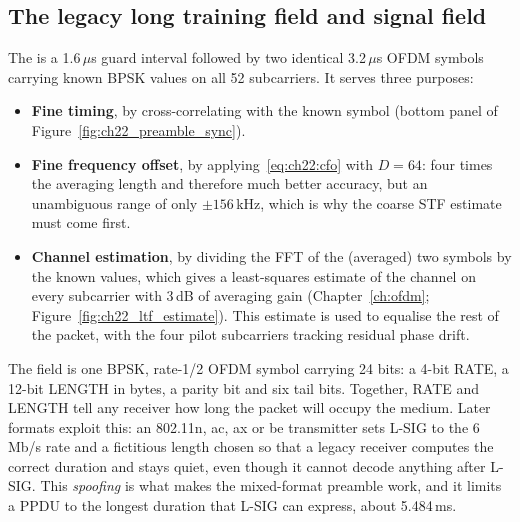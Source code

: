 \subsection{The legacy long training field and signal field}


The  is a 1.6\,$\mu$s guard interval followed by two identical 3.2\,$\mu$s OFDM symbols
carrying known BPSK values on all 52 subcarriers. It serves three purposes:
\begin{itemize}
\item \textbf{Fine timing}, by cross-correlating with the known symbol (bottom panel of
Figure~\ref{fig:ch22_preamble_sync}).
\item \textbf{Fine frequency offset}, by applying~\eqref{eq:ch22:cfo} with $D=64$: four times the
averaging length and therefore much better accuracy, but an unambiguous range of only
$\pm156$\,kHz, which is why the coarse STF estimate must come first.
\item \textbf{Channel estimation}, by dividing the FFT of the (averaged) two symbols by the known
values, which gives a least-squares estimate of the channel on every subcarrier with 3\,dB of
averaging gain (Chapter~\ref{ch:ofdm}; Figure~\ref{fig:ch22_ltf_estimate}). This estimate is used to equalise the rest of the packet,
with the four pilot subcarriers tracking residual phase drift.
\end{itemize}

The  field is one BPSK, rate-1/2 OFDM symbol carrying 24 bits: a 4-bit RATE, a 12-bit
LENGTH in bytes, a parity bit and six tail bits. Together, RATE and LENGTH tell any receiver how
long the packet will occupy the medium. Later formats exploit this: an 802.11n, ac, ax or be
transmitter sets L-SIG to the 6\,Mb/s rate and a fictitious length chosen so that a legacy receiver
computes the correct duration and stays quiet, even though it cannot decode anything after L-SIG.
This \emph{spoofing} is what makes the mixed-format preamble work, and it limits a PPDU to the
longest duration that L-SIG can express, about 5.484\,ms.


